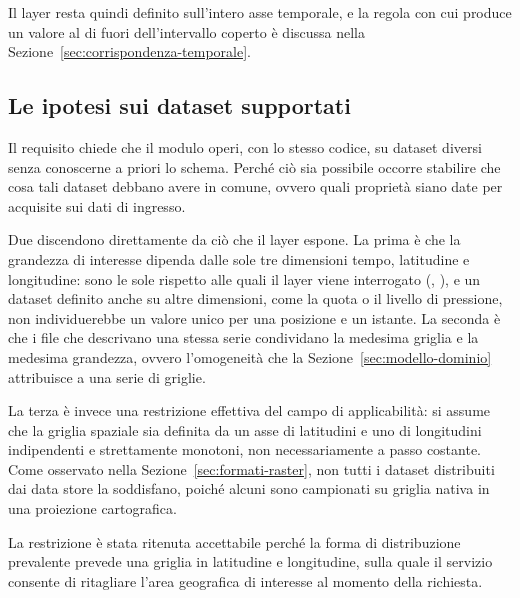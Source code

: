Il layer resta quindi definito sull'intero asse temporale, e la regola con cui
produce un valore al di fuori dell'intervallo coperto è discussa nella
Sezione~\ref{sec:corrispondenza-temporale}.

\subsection{Le ipotesi sui dataset supportati}
\label{subsec:griglie-supportate}

Il requisito  chiede che il modulo operi, con lo stesso codice, su dataset diversi
senza conoscerne a priori lo schema. Perché ciò sia possibile occorre stabilire che cosa
tali dataset debbano avere in comune, ovvero quali proprietà siano date per acquisite
sui dati di ingresso.

Due discendono direttamente da ciò che il layer espone. La prima è che la grandezza di
interesse dipenda dalle sole tre dimensioni tempo, latitudine e longitudine: sono le sole
rispetto alle quali il layer viene interrogato (, ), e un dataset definito
anche su altre dimensioni, come la quota o il livello di pressione, non individuerebbe un
valore unico per una posizione e un istante. La seconda è che i file che descrivano una
stessa serie condividano la medesima griglia e la medesima grandezza, ovvero l'omogeneità
che la Sezione~\ref{sec:modello-dominio} attribuisce a una serie di griglie.

La terza è invece una restrizione effettiva del campo di applicabilità: si assume che la
griglia spaziale sia definita da un asse di latitudini e uno di longitudini indipendenti e
strettamente monotoni, non necessariamente a passo costante. Come osservato nella
Sezione~\ref{sec:formati-raster}, non tutti i dataset distribuiti dai data store la
soddisfano, poiché alcuni sono campionati su griglia nativa in una proiezione cartografica.

La restrizione è stata ritenuta accettabile perché la forma di distribuzione
prevalente prevede una griglia in latitudine e longitudine, sulla quale il
servizio consente di ritagliare l'area geografica di interesse al momento della richiesta.

